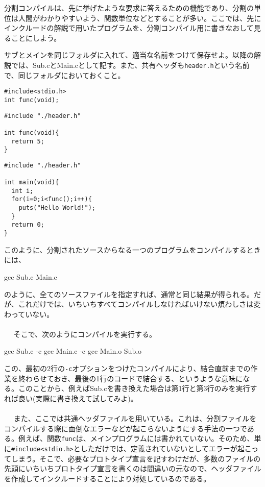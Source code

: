 分割コンパイルは、先に挙げたような要求に答えるための機能であり、分割の単位は人間がわかりやすいよう、関数単位などとすることが多い。ここでは、先にインクルードの解説で用いたプログラムを、分割コンパイル用に書きなおして見ることにしよう。
\begin{boxnote}
サブとメインを同じフォルダに入れて、適当な名前をつけて保存せよ。以降の解説では、Sub.cとMain.cとして記す。また、共有ヘッダも\verb|header.h|という名前で、同じフォルダにおいておくこと。
\begin{multicols}{2}
\begin{lstlisting}[caption=共有ヘッダ(header.h),label=program6_6_1]
#include<stdio.h>
int func(void);
\end{lstlisting}
\begin{lstlisting}[caption=分割コンパイル確認(サブ),label=program6_6_2]
#include "./header.h"

int func(void){
  return 5;
}
\end{lstlisting}
\begin{lstlisting}[caption=分割コンパイル確認(メイン),label=program6_6_3]
#include "./header.h"

int main(void){
  int i;
  for(i=0;i<func();i++){
    puts("Hello World!");
  }
  return 0;
}
\end{lstlisting}
\end{multicols}
\end{boxnote}
このように、分割されたソースからなる一つのプログラムをコンパイルするときには、
\begin{code}
gcc Sub.c Main.c
\end{code}
のように、全てのソースファイルを指定すれば、通常と同じ結果が得られる。だが、これだけでは、いちいちすべてコンパイルしなければいけない煩わしさは変わっていない。
\\ \\　
そこで、次のようにコンパイルを実行する。
\begin{code}
gcc Sub.c -c
gcc Main.c -c
gcc Main.o Sub.o
\end{code}
この、最初の2行の\verb|-c|オプションをつけたコンパイルにより、結合直前までの作業を終わらせておき、最後の1行のコードで結合する、というような意味になる。このことから、例えばSub.cを書き換えた場合は第1行と第3行のみを実行すれば良い(実際に書き換えて試してみよ)。
\\ \\　
また、ここでは共通ヘッダファイルを用いている。これは、分割ファイルをコンパイルする際に面倒なエラーなどが起こらないようにする手法の一つである。例えば、関数\verb|func|は、メインプログラムには書かれていない。そのため、単に\verb|#include<stdio.h>|としただけでは、定義されていないとしてエラーが起こってしまう。そこで、必要なプロトタイプ宣言を記すわけだが、多数のファイルの先頭にいちいちプロトタイプ宣言を書くのは間違いの元なので、ヘッダファイルを作成してインクルードすることにより対処しているのである。

